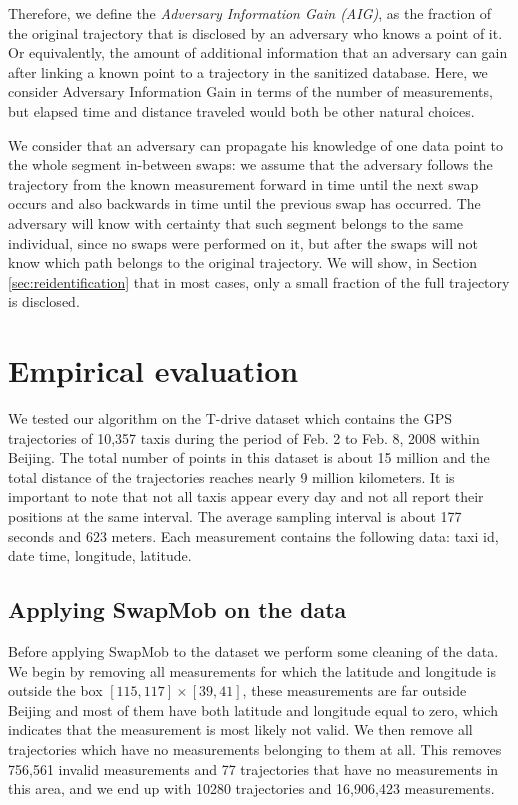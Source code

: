 \documentclass[review]{elsarticle}
\begin{document}
Therefore, we define the \emph{Adversary Information Gain (AIG)}, as the fraction of the original trajectory that is disclosed by an adversary who knows a point of it. Or equivalently, the amount of additional information that an adversary can gain after linking a known point to a trajectory in the sanitized database.
Here, we consider Adversary Information Gain in terms of the number of measurements, but elapsed time and distance traveled would both be other natural choices.

We consider that an adversary can propagate his knowledge of one data point to the whole segment in-between swaps: we assume that the adversary follows the trajectory from the known measurement forward in time until the next swap occurs and also backwards in time until the previous swap has occurred. 
The adversary will know with certainty that such segment belongs to the same individual, since no swaps were performed on it, but after the swaps will not know which path belongs to the original trajectory.
We will show, in Section \ref{sec:reidentification}
that in most cases, only a small fraction of the full trajectory is disclosed.


\section{Empirical evaluation}\label{Sec:evaluation}
We tested our algorithm on the T-drive dataset
\cite{Yuan2010,Yuan2011} which contains the GPS trajectories of
10,357 taxis during the period of Feb. 2 to Feb. 8, 2008 within
Beijing. The total number of points in this dataset is about 15
million and the total distance of the trajectories reaches nearly 9
million kilometers. It is important to note that not all taxis appear
every day and not all report their positions at the same interval. The
average sampling interval is about 177 seconds and 623 meters. Each
measurement contains the following data: taxi id, date time,
longitude, latitude.

\subsection{Applying SwapMob on the data}
Before applying SwapMob to the dataset we perform some cleaning of the
data. We begin by removing all measurements for which the latitude and
longitude is outside the box $[115, 117] \times [39, 41]$, these
measurements are far outside Beijing and most of them have both
latitude and longitude equal to zero, which indicates that the
measurement is most likely not valid. We then remove all trajectories
which have no measurements belonging to them at all. This
removes 756,561 invalid measurements and 77 trajectories that have no
measurements in this area, and we end up with 10280 trajectories and 16,906,423
measurements.
\end{document}
